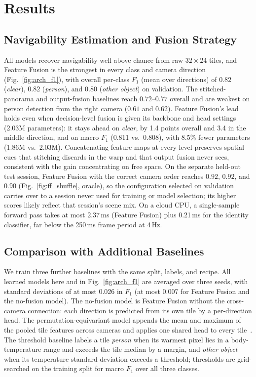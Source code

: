 \section{Results}
\label{sec:results}

\subsection{Navigability Estimation and Fusion Strategy}

All models recover navigability well above chance from raw $32\times24$
tiles, and Feature Fusion is the strongest in every class and camera direction
(Fig.~\ref{fig:arch_f1}), with overall per-class $F_1$ (mean over directions) of $0.82$
(\textit{clear}), $0.82$ (\textit{person}), and $0.80$ (\textit{other object})
on validation. The stitched-panorama and output-fusion baselines reach
$0.72$--$0.77$ overall and are weakest on person detection from the right
camera ($0.61$ and $0.62$). Feature Fusion's lead holds even when
decision-level fusion is given its backbone and head settings (2.03M
parameters): it stays ahead on \textit{clear}, by 1.4 points overall and 3.4 in
the middle direction, and on macro $F_1$ (0.811 vs.\ 0.808), with 8.5\% fewer parameters (1.86M
vs.\ 2.03M). Concatenating feature
maps at every level preserves spatial cues that stitching discards in the warp
and that output fusion never sees, consistent with the gain concentrating on
free space. On the separate held-out test session, Feature Fusion with the
correct camera order reaches $0.92$, $0.92$, and $0.90$
(Fig.~\ref{fig:ff_shuffle}, oracle), so the configuration selected on
validation carries over to a session never used for training or model
selection; its higher scores likely reflect that session's scene mix. On a cloud CPU, a single-sample forward pass takes at most
2.37\,ms (Feature Fusion) plus 0.21\,ms for the identity classifier, far below
the 250\,ms frame period at 4\,Hz.

\subsection{Comparison with Additional Baselines}

We train three further baselines with the same split, labels, and recipe. All
learned models here and in Fig.~\ref{fig:arch_f1} are averaged over three
seeds, with standard deviations of at most 0.026 in $F_1$ (at most 0.007 for
Feature Fusion and the no-fusion model). The no-fusion model is Feature Fusion
without the cross-camera connection: each direction is predicted from its own
tile by a per-direction head. The permutation-equivariant model appends the
mean and maximum of the pooled tile features across cameras and applies one
shared head to every tile~\cite{zaheer2017deepsets}. The threshold baseline
labels a tile \textit{person} when its warmest pixel lies in a body-temperature
range and exceeds the tile median by a margin, and \textit{other object} when
its temperature standard deviation exceeds a threshold; thresholds are
grid-searched on the training split for macro $F_1$ over all three classes.

